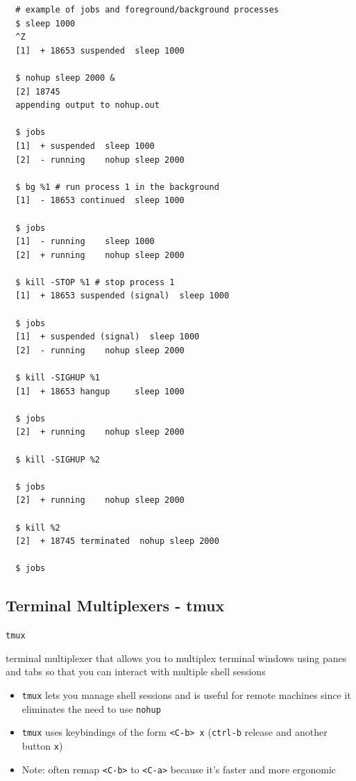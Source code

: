 \documentclass[letterpaper,12pt]{article}
\newcommand*{\lstitem}[1]{
  \setbox0\hbox{\lstinline{#1}}
  \item[\usebox0]
}
\begin{document}
\begin{lstlisting}
  # example of jobs and foreground/background processes
  $ sleep 1000
  ^Z
  [1]  + 18653 suspended  sleep 1000

  $ nohup sleep 2000 &
  [2] 18745
  appending output to nohup.out

  $ jobs
  [1]  + suspended  sleep 1000
  [2]  - running    nohup sleep 2000

  $ bg %1 # run process 1 in the background
  [1]  - 18653 continued  sleep 1000

  $ jobs
  [1]  - running    sleep 1000
  [2]  + running    nohup sleep 2000

  $ kill -STOP %1 # stop process 1
  [1]  + 18653 suspended (signal)  sleep 1000

  $ jobs
  [1]  + suspended (signal)  sleep 1000
  [2]  - running    nohup sleep 2000

  $ kill -SIGHUP %1
  [1]  + 18653 hangup     sleep 1000

  $ jobs
  [2]  + running    nohup sleep 2000

  $ kill -SIGHUP %2

  $ jobs
  [2]  + running    nohup sleep 2000

  $ kill %2
  [2]  + 18745 terminated  nohup sleep 2000

  $ jobs

\end{lstlisting}


\subsection{Terminal Multiplexers - tmux}

\begin{description}
 \lstitem{tmux} terminal multiplexer that allows you to multiplex terminal windows using panes and tabs so that you can interact with multiple shell sessions
\end{description}

\begin{itemize}
 \item \lstinline{tmux} lets you manage shell sessions and is useful for remote machines since it eliminates the need to use \lstinline{nohup}
 \item \lstinline{tmux} uses keybindings of the form \lstinline{<C-b> x} (\lstinline{ctrl-b} release and another button \lstinline{x})
 \item Note: often remap \lstinline{<C-b>} to \lstinline{<C-a>} because it's faster and more ergonomic
\end{itemize}
\end{document}
